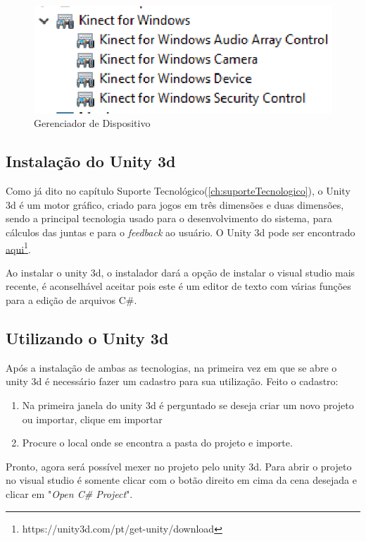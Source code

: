 \begin{figure}[H]
\centering
\includegraphics [keepaspectratio=true,scale=0.60]{figuras/gerenciadorDispositivo.eps}

\caption{Gerenciador de Dispositivo}
\label{gerenciadorDispositivo}
\end{figure}

\subsection{Instalação do Unity 3d}\label{sub:instalacaoUnity}
  Como já dito no capítulo Suporte Tecnológico(\ref{ch:suporteTecnologico}), o Unity 3d é um motor gráfico, criado para jogos em três dimensões e duas dimensões,
sendo a principal tecnologia usado para o desenvolvimento do sistema, para cálculos das juntas e para o \textit{feedback} ao usuário.
O Unity 3d pode ser encontrado \href{https://unity3d.com/pt/get-unity/download}{aqui}\footnote{https://unity3d.com/pt/get-unity/download}.

  Ao instalar o unity 3d, o instalador dará
a opção de instalar o visual studio mais recente, é aconselhável aceitar pois este é um editor de texto com várias funções para a edição
de arquivos C\#.

\subsection{Utilizando o Unity 3d}
  Após a instalação de ambas as tecnologias, na primeira vez em que se abre o unity 3d é necessário fazer um cadastro para sua utilização. Feito
o cadastro:
\begin{enumerate}
  \item Na primeira janela do unity 3d é perguntado se deseja criar um novo projeto ou importar, clique em importar
  \item Procure o local onde se encontra a pasta do projeto e importe.
\end{enumerate}

  Pronto, agora será possível mexer no projeto pelo unity 3d. Para abrir o projeto no visual studio é somente clicar com o botão direito em cima
da cena desejada e clicar em "\textit{Open C\# Project}".

